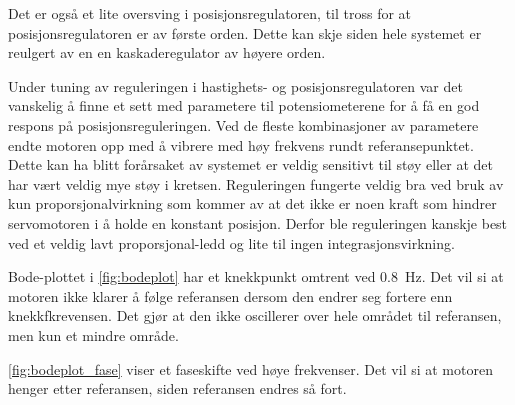 Det er også et lite oversving i posisjonsregulatoren, til tross for at posisjonsregulatoren er av første orden. Dette kan skje siden hele systemet er reulgert av en en kaskaderegulator av høyere orden.

Under tuning av reguleringen i hastighets- og posisjonsregulatoren var det vanskelig å finne et sett med parametere til potensiometerene for å få en god respons på posisjonsreguleringen. 
Ved de fleste kombinasjoner av parametere endte motoren opp med å vibrere med høy frekvens rundt referansepunktet. 
Dette kan ha blitt forårsaket av systemet er veldig sensitivt til støy eller at det har vært veldig mye støy i kretsen.
Reguleringen fungerte veldig bra ved bruk av kun proporsjonalvirkning som kommer av at det ikke er noen kraft som hindrer servomotoren i å holde en konstant posisjon.
Derfor ble reguleringen kanskje best ved et veldig lavt proporsjonal-ledd og lite til ingen integrasjonsvirkning.


Bode-plottet i \autoref{fig:bodeplot} har et knekkpunkt omtrent ved \SI{0.8}{\hertz}. Det vil si at motoren ikke klarer å følge referansen dersom den endrer seg fortere enn knekkfkrevensen. Det gjør at den ikke oscillerer over hele området til referansen, men kun et mindre område. 

\autoref{fig:bodeplot_fase} viser et faseskifte ved høye frekvenser. Det vil si at motoren henger etter referansen, siden referansen endres så fort.

























%     

